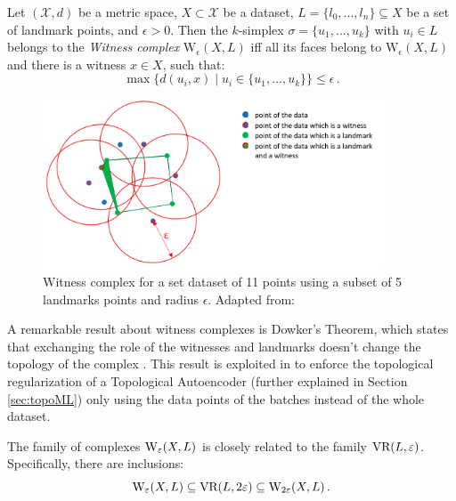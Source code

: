 \documentclass[../main.tex]{subfiles}
\begin{document}
\begin{definition}
Let $(\mathcal{X}, d)$ be a metric space, $X \subset \mathcal{X}$ be a dataset, $L = \{l_0, ..., l_n\} \subseteq X$ be a set of landmark points, and $\epsilon>0$. Then the $k$-simplex $\sigma = \{u_1, ..., u_k\}$ with $u_i \in L$ belongs to the \emph{Witness complex} $\text{W}_\epsilon(X, L)$ iff all its faces belong to $\text{W}_\epsilon(X, L)$ and there is a witness $x \in X$, such that:
\[
\max \{d(u_i, x) \mid u_i \in \{u_1, ..., u_k\}\} \leq \epsilon\,.
\]
\end{definition}

\begin{figure}[!ht]
\centering
\includegraphics[width=0.9\textwidth]{figures/bg/witnessCons.png} 
    \caption{Witness complex for a set  dataset of 11 points using a subset of 5 landmarks points and radius $\epsilon$. Adapted from: \cite{medbouhi_towards_2022}}
\label{fig:witnessCons}
\end{figure}

A remarkable result about witness complexes is Dowker's Theorem, which states that exchanging the role of the witnesses and landmarks doesn't change the topology of the complex \cite{dowker_homology_1952}. This result is exploited in \cite{schonenberger_witness_2022} to enforce the topological regularization of a Topological Autoencoder (further explained in Section \ref{sec:topoML}) only using the data points of the batches instead of the whole dataset.

\begin{proposition}
The family of complexes $\text{\rm W}_\epsilon(X, L)$ is closely related to the family $\text{\rm VR}(L, \epsilon)$. Specifically, there are inclusions:
\[
\text{\rm W}_\epsilon(X, L) \subseteq \text{\rm VR}(L, 2\epsilon) \subseteq \text{\rm W}_{2\epsilon}(X, L)\,.
\]
\end{proposition}
\end{document}
